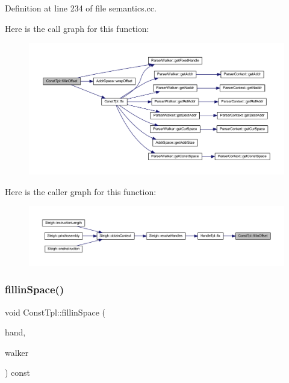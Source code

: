 Definition at line 234 of file semantics.\+cc.

Here is the call graph for this function\+:
\nopagebreak
\begin{figure}[H]
\begin{center}
\leavevmode
\includegraphics[width=350pt]{class_const_tpl_a80f254aea88a52ec15deed96f46d1b97_cgraph}
\end{center}
\end{figure}
Here is the caller graph for this function\+:
\nopagebreak
\begin{figure}[H]
\begin{center}
\leavevmode
\includegraphics[width=350pt]{class_const_tpl_a80f254aea88a52ec15deed96f46d1b97_icgraph}
\end{center}
\end{figure}
\mbox{\label{class_const_tpl_ad04e4bde130998d2083f9befd8472d66}} 
\subsubsection{\texorpdfstring{fillinSpace()}{fillinSpace()}}
{\footnotesize\ttfamily void Const\+Tpl\+::fillin\+Space (\begin{DoxyParamCaption}\item[{\mbox{\hyperlink{struct_fixed_handle}{Fixed\+Handle}} \&}]{hand,  }\item[{const \mbox{\hyperlink{class_parser_walker}{Parser\+Walker}} \&}]{walker }\end{DoxyParamCaption}) const}



